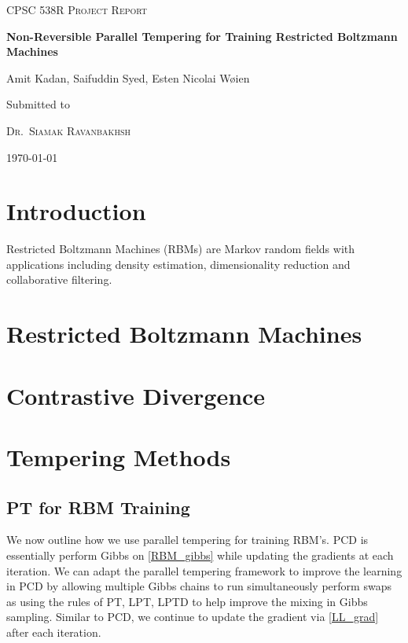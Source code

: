 \documentclass[12pt]{article}
\begin{document}
\begin{titlepage}
	\centering
	
	{\scshape \Large CPSC 538R Project Report
\par}
	\vspace{1cm}
	{\huge\bfseries Non-Reversible Parallel Tempering for Training Restricted Boltzmann Machines
\par}
	\vspace{0.5cm}
	{\Large  Amit Kadan, Saifuddin Syed, Esten Nicolai W{\o}ien
\par}

	\vfill
	Submitted to\par
	{\scshape Dr.~Siamak Ravanbakhsh}\\
		{ \today\par}



\end{titlepage}

\tableofcontents
\newpage

\section{Introduction}
Restricted Boltzmann Machines (RBMs) are Markov random fields with applications including density estimation, 
dimensionality reduction and collaborative filtering. 

\section{Restricted Boltzmann Machines}


\section{Contrastive Divergence}

\section{Tempering Methods}


\subsection{PT for RBM Training}
We now outline how we use parallel tempering for training RBM's. PCD is essentially perform Gibbs on \eqref{RBM_gibbs} while updating the gradients at each iteration. We can adapt the parallel tempering framework to improve the learning in PCD by allowing multiple Gibbs chains to run simultaneously perform swaps as using the rules of PT, LPT, LPTD to help improve the mixing in Gibbs sampling. Similar to PCD, we continue to update the gradient via \eqref{LL_grad} after each iteration. 
\end{document}
